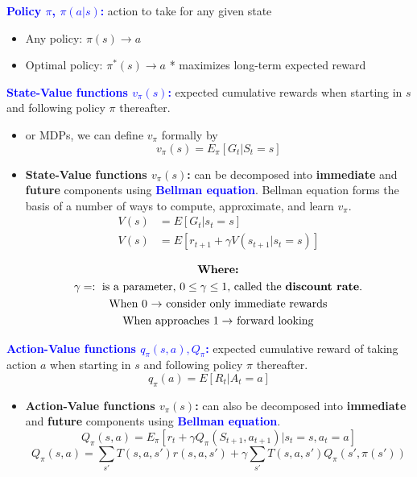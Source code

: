 \documentclass[12pt, a4paper]{article}
\begin{document}
\textcolor{blue}{\textbf{Policy \(\pi\), \(\pi(a|s)\):}} action to take for any given
state

\begin{itemize}
  \item Any policy: \(\pi(s) \rightarrow a\)
  \item Optimal policy:
  \(\pi^*(s) \rightarrow a\) * maximizes long-term expected reward
\end{itemize}


\textcolor{blue}{\textbf{State-Value functions \(v_\pi(s)\):}} expected cumulative rewards
when starting in \(s\) and following policy \(\pi\) thereafter.

\begin{itemize}
  \item or MDPs, we can define \(v_\pi\) formally by
  $$v_\pi(s) = E_\pi[G_t|S_t=s]$$

  \item \textbf{State-Value functions \(v_\pi(s)\):} can be decomposed into \textbf{immediate} and \textbf{future} components using \textcolor{blue}{\textbf{Bellman equation}}. Bellman equation forms the basis of a number of ways to compute, approximate, and learn \(v_\pi\).
  \begin{align*}
  V(s) &= E[G_t | s_t = s] \\
  V(s) &= E[r_{t+1} + \gamma V(s_{t+1} | s_t = s)] \\
  \end{align*}
  \begin{gather*}
    \textbf{Where:} \\
    \gamma =: \text{ is a parameter, \(0 \leq \gamma \leq 1\), called the
    \textbf{discount rate}.} \\
    \text{When \(0\) \(\rightarrow\) consider only
    immediate rewards} \\
    \text{When approaches \(1 \rightarrow\) forward looking}
  \end{gather*}
\end{itemize}

\textcolor{blue}{\textbf{Action-Value functions \(q_\pi(s, a), Q_\pi\):}} expected cumulative reward of taking action \(a\) when starting in \(s\) and
following policy \(\pi\) thereafter.
$$q_\pi(a) = E[R_t | A_t = a]$$

\begin{itemize}
  \item \textbf{Action-Value functions \(v_\pi(s)\):} can also be decomposed
  into \textbf{immediate} and \textbf{future} components using
  \textcolor{blue}{\textbf{Bellman equation}}.
  $$Q_\pi(s,a) = E_\pi[r_t + \gamma Q_\pi (S_{t+1}, a_{t+1}) | s_t=s, a_t=a]$$
  $$Q_\pi(s,a) = \sum_{s'} T(s,a,s') r(s,a,s') + \gamma \sum_{s'}T(s,a,s')Q_\pi(s',\pi(s'))$$
\end{itemize}
\end{document}
